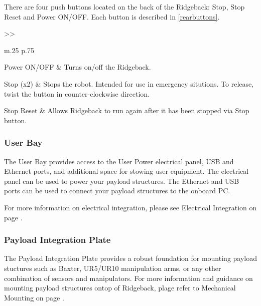 \documentclass[]{clearpath-latex/clearpath-manual}
\begin{document}
There are four push buttons located on the back of the Ridgeback: Stop, Stop Reset and Power ON/OFF.   Each button is described in \autoref{rearbuttons}. 

\bgroup
\def\arraystretch{1.2}%
\begin{table}[h]
	\centering
	\begin{tabular}{>{}>{\raggedright}m{.25\textwidth} p{.75\textwidth}} \hline 

	Power ON/OFF & Turns on/off the Ridgeback. \\ \hline

	Stop (x2) & Stops the robot.  Intended for use in emergency situtions.  To release, twist the button in counter-clockwise direction.  \\ \hline	
	
	Stop Reset & Allows Ridgeback to run again after it has been stopped via Stop button.    \\ \hline	
	
	\end{tabular}
\newline
\caption{Ridgeback Rear Buttons}
\label{rearbuttons}
\end{table}
\egroup


\subsubsection{User Bay}

The User Bay provides access to the User Power electrical panel, USB and Ethernet ports, and additional space for stowing user equipment.  The electrical panel can be used to power your payload structures.   The Ethernet and USB ports can be used to connect your payload structures to the onboard PC.  

For more information on electrical integration, please see Electrical Integration on page \pageref{electrical}.


\subsubsection{Payload Integration Plate}

The Payload Integration Plate provides a robust foundation for mounting payload stuctures such as Baxter, UR5/UR10 manipulation arms, or any other combination of sensors and manipulators.   For more information and guidance on mounting payload structures ontop of Ridgeback, plage refer to Mechanical Mounting on page \pageref{mechanical}.
\end{document}
